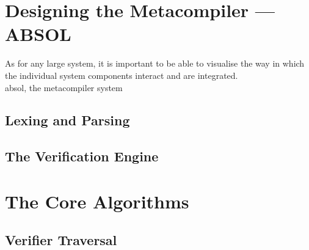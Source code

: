 \section{Designing the Metacompiler --- ABSOL} %
\label{sec:designing_the_metacompiler_absol}

As for any large system, it is important to be able to visualise the way in which the individual system components interact and are integrated. \\

\gls{absol}, the metacompiler system 

\subsection{Lexing and Parsing} %
\label{sub:lexing_and_parsing}


\subsection{The Verification Engine} %
\label{sub:the_verification_engine}



\section{The Core Algorithms} %
\label{sec:the_core_algorithms}

\subsection{Verifier Traversal} %
\label{sub:verifier_traversal}

